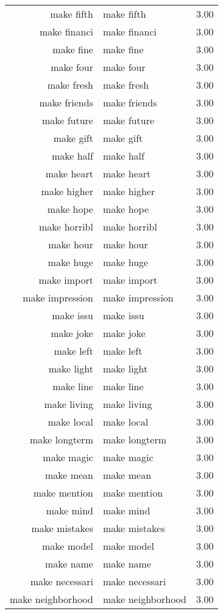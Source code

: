 \begin{table}[ht]
\begin{tabular}{rlr}
  make fifth & make fifth & 3.00 \\ 
  make financi & make financi & 3.00 \\ 
  make fine & make fine & 3.00 \\ 
  make four & make four & 3.00 \\ 
  make fresh & make fresh & 3.00 \\ 
  make friends & make friends & 3.00 \\ 
  make future & make future & 3.00 \\ 
  make gift & make gift & 3.00 \\ 
  make half & make half & 3.00 \\ 
  make heart & make heart & 3.00 \\ 
  make higher & make higher & 3.00 \\ 
  make hope & make hope & 3.00 \\ 
  make horribl & make horribl & 3.00 \\ 
  make hour & make hour & 3.00 \\ 
  make huge & make huge & 3.00 \\ 
  make import & make import & 3.00 \\ 
  make impression & make impression & 3.00 \\ 
  make issu & make issu & 3.00 \\ 
  make joke & make joke & 3.00 \\ 
  make left & make left & 3.00 \\ 
  make light & make light & 3.00 \\ 
  make line & make line & 3.00 \\ 
  make living & make living & 3.00 \\ 
  make local & make local & 3.00 \\ 
  make longterm & make longterm & 3.00 \\ 
  make magic & make magic & 3.00 \\ 
  make mean & make mean & 3.00 \\ 
  make mention & make mention & 3.00 \\ 
  make mind & make mind & 3.00 \\ 
  make mistakes & make mistakes & 3.00 \\ 
  make model & make model & 3.00 \\ 
  make name & make name & 3.00 \\ 
  make necessari & make necessari & 3.00 \\ 
  make neighborhood & make neighborhood & 3.00 \\ 

\end{tabular}
\end{table}
